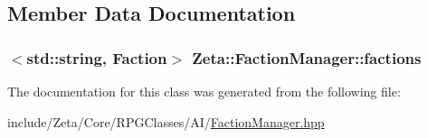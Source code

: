 \subsection{Member Data Documentation}
\hypertarget{classZeta_1_1FactionManager_aac5322c29ef171ee50661c38767681f4}{
\subsubsection[{factions}]{$<$std\+::string, {\bf Faction}$>$ Zeta\+::\+Faction\+Manager\+::factions\hspace{0.3cm}{\ttfamily [private]}}}\label{classZeta_1_1FactionManager_aac5322c29ef171ee50661c38767681f4}


The documentation for this class was generated from the following file\+:\begin{DoxyCompactItemize}
\item 
include/\+Zeta/\+Core/\+R\+P\+G\+Classes/\+A\+I/\hyperlink{FactionManager_8hpp}{Faction\+Manager.\+hpp}\end{DoxyCompactItemize}
